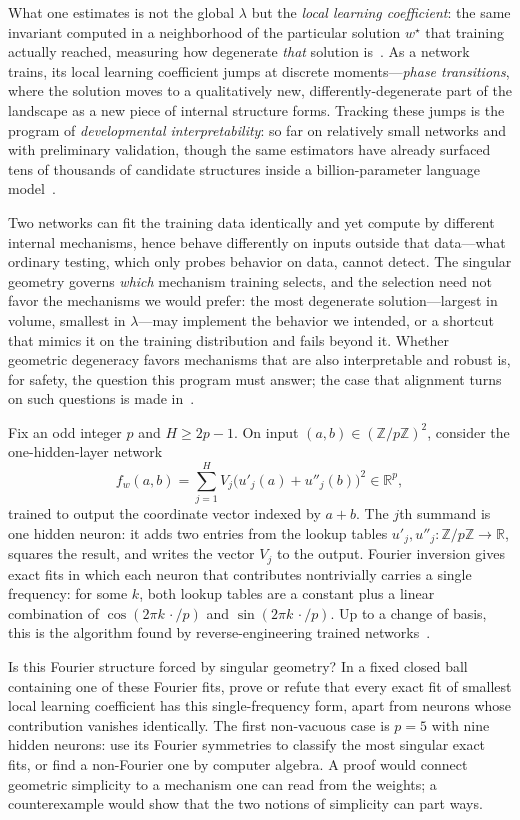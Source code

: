 What one estimates is not the global $\lambda$ but the \emph{local learning coefficient}: the same invariant computed in a neighborhood of the particular solution $w^\star$ that training actually reached, measuring how degenerate \emph{that} solution is~\cite{lau2023}. As a network trains, its local learning coefficient jumps at discrete moments---\emph{phase transitions}, where the solution moves to a qualitatively new, differently-degenerate part of the landscape as a new piece of internal structure forms. Tracking these jumps is the program of \emph{developmental interpretability}: so far on relatively small networks and with preliminary validation, though the same estimators have already surfaced tens of thousands of candidate structures inside a billion-parameter language model~\cite{murfet2026}.

Two networks can fit the training data identically and yet compute by different internal mechanisms, hence behave differently on inputs outside that data---what ordinary testing, which only probes behavior on data, cannot detect. The singular geometry governs \emph{which} mechanism training selects, and the selection need not favor the mechanisms we would prefer: the most degenerate solution---largest in volume, smallest in $\lambda$---may implement the behavior we intended, or a shortcut that mimics it on the training distribution and fails beyond it. Whether geometric degeneracy favors mechanisms that are also interpretable and robust is, for safety, the question this program must answer; the case that alignment turns on such questions is made in~\cite{lehalleur2025}.

\begin{openproblem}
Fix an odd integer $p$ and $H\geq 2p-1$. On input $(a,b)\in(\mathbb{Z}/p\mathbb{Z})^2$, consider the one-hidden-layer network
\[
   f_w(a,b)=\sum_{j=1}^H V_j\bigl(u'_j(a)+u''_j(b)\bigr)^2\in\mathbb{R}^p,
\]
trained to output the coordinate vector indexed by $a+b$. The $j$th summand is one hidden neuron: it adds two entries from the lookup tables $u'_j,u''_j\colon\mathbb{Z}/p\mathbb{Z}\to\mathbb{R}$, squares the result, and writes the vector $V_j$ to the output. Fourier inversion gives exact fits in which each neuron that contributes nontrivially carries a single frequency: for some $k$, both lookup tables are a constant plus a linear combination of $\cos(2\pi k\,\cdot/p)$ and $\sin(2\pi k\,\cdot/p)$. Up to a change of basis, this is the algorithm found by reverse-engineering trained networks~\cite{nanda2023}.

Is this Fourier structure forced by singular geometry? In a fixed closed ball containing one of these Fourier fits, prove or refute that every exact fit of smallest local learning coefficient has this single-frequency form, apart from neurons whose contribution vanishes identically. The first non-vacuous case is $p=5$ with nine hidden neurons: use its Fourier symmetries to classify the most singular exact fits, or find a non-Fourier one by computer algebra. A proof would connect geometric simplicity to a mechanism one can read from the weights; a counterexample would show that the two notions of simplicity can part ways.
\end{openproblem}

